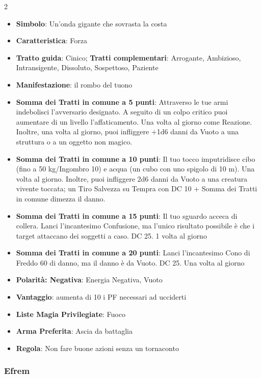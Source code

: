 \begin{multicols}{2}
\begin{itemize}[leftmargin=*] \setlength{\itemsep}{0pt}
\item \textbf{Simbolo}: Un'onda gigante che sovrasta la costa
\item \textbf{Caratteristica}: Forza
\item \textbf{Tratto guida}: Cinico; \textbf{Tratti complementari}: Arrogante, Ambizioso, Intransigente, Dissoluto, Sospettoso, Paziente
\item \textbf{Manifestazione}: il rombo del tuono
\item \textbf{Somma dei Tratti in comune a 5 punti}: Attraverso le tue armi indebolisci l'avversario designato. A seguito di un colpo critico puoi aumentare di un livello l'affaticamento. Una volta al giorno come Reazione. Inoltre, una volta al giorno, puoi infliggere +1d6 danni da Vuoto a una struttura o a un oggetto non magico.
\item \textbf{Somma dei Tratti in comune a 10 punti}: Il tuo tocco imputridisce cibo (fino a 50 kg/Ingombro 10) e acqua (un cubo con uno spigolo di 10 m). Una volta al giorno. Inoltre, puoi infliggere 2d6 danni da Vuoto a una creatura vivente toccata; un Tiro Salvezza su Tempra con DC 10 + Somma dei Tratti in comune dimezza il danno.
\item \textbf{Somma dei Tratti in comune a 15 punti}: Il tuo sguardo acceca di collera. Lanci l'incantesimo Confusione, ma l'unico risultato possibile è che i target attaccano dei soggetti a caso. DC 25. 1 volta al giorno
\item \textbf{Somma dei Tratti in comune a 20 punti}: Lanci l'incantesimo Cono di Freddo 60 di danno, ma il danno è da Vuoto. DC 25. Una volta al giorno
\item \textbf{Polarità: Negativa}: Energia Negativa, Vuoto
\item \textbf{Vantaggio}: aumenta di 10 i PF necessari ad ucciderti
\item \textbf{Liste Magia Privilegiate}: Fuoco
\item \textbf{Arma Preferita}: Ascia da battaglia
\item \textbf{Regola}: Non fare buone azioni senza un tornaconto
\end{itemize}

\subsubsection{Efrem}\label{efrem}\hypertarget{efrem}{}


\end{multicols}
